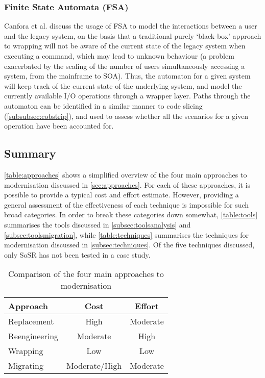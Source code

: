 \documentclass[12pt,journal,compsoc]{IEEEtran}
\begin{document}
\subsubsection{Finite State Automata (FSA)}
Canfora et al. \cite{Canfora2006,Canfora2008} discuss the usage of FSA to model the interactions between a user and the legacy system, on the basis that a traditional purely `black-box' approach to wrapping will not be aware of the current state of the legacy system when executing a command, which may lead to unknown behaviour (a problem exacerbated by the scaling of the number of users simultaneously accessing a system, from the mainframe to SOA). Thus, the automaton for a given system will keep track of the current state of the underlying system, and model the currently available I/O operations through a wrapper layer. Paths through the automaton can be identified in a similar manner to code slicing (\autoref{subsubsec:cobstrip}), and used to assess whether all the scenarios for a given operation have been accounted for.

\subsection{Summary}
\label{subsec:summary}

\autoref{table:approaches} shows a simplified overview of the four main approaches to modernisation discussed in \autoref{sec:approaches}. For each of these approaches, it is possible to provide a typical cost and effort estimate. However, providing a general assessment of the effectiveness of each technique is impossible for such broad categories. In order to break these categories down somewhat, \autoref{table:tools} summarises the tools discussed in \autoref{subsec:toolsanalysis} and \autoref{subsec:toolsmigration}, while \autoref{table:techniques} summarises the techniques for modernisation discussed in \autoref{subsec:techniques}. Of the five techniques discussed, only SoSR has not been tested in a case study.

\begin{table}[h!]
\caption{Comparison of the four main approaches to modernisation}
\label{table:approaches}
\centering
\begin{tabular}{| l | c | c |}
  \hline
  \textbf{Approach} & \textbf{Cost} & \textbf{Effort} \\ \hline
  Replacement & High & Moderate \\ \hline
  Reengineering & Moderate & High \\ \hline
  Wrapping & Low & Low \\ \hline
  Migrating & Moderate/High & Moderate \\ \hline
\end{tabular}
\end{table}
\end{document}
